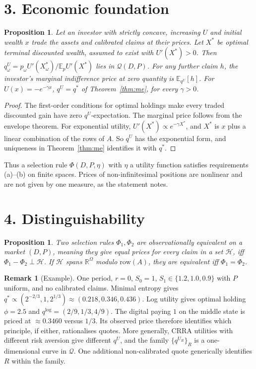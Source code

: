 \documentclass[11pt]{article}
\newtheorem{proposition}[theorem]{Proposition}
\theoremstyle{definition}
\newtheorem{remark}[theorem]{Remark}
\begin{document}
\section*{3. Economic foundation}
\begin{proposition}\label{prop:util}
Let an investor with strictly concave, increasing $U$ and initial wealth $x$ trade the assets and calibrated claims at
their prices. Let $X^*$ be optimal terminal discounted wealth, assumed to exist with $U'(X^*)>0$. Then
$q^U_\omega=p_\omega U'(X^*_\omega)/\mathbb E_pU'(X^*)$ lies in $\mathcal Q(D,P)$. For any further claim $h$, the
investor's marginal indifference price at zero quantity is $\mathbb E_{q^U}[h]$. For $U(x)=-e^{-\gamma x}$, $q^U=q^*$ of
Theorem~\ref{thm:me}, for every $\gamma>0$.
\end{proposition}
\begin{proof}
The first-order conditions for optimal holdings make every traded discounted gain have zero $q^U$-expectation. The
marginal price follows from the envelope theorem. For exponential utility, $U'(X^*)\propto e^{-\gamma X^*}$, and $X^*$ is
$x$ plus a linear combination of the rows of $A$. So $q^U$ has the exponential form, and uniqueness in
Theorem~\ref{thm:me} identifies it with $q^*$.
\end{proof}
Thus a selection rule $\Phi(D,P,\eta)$ with $\eta$ a utility function satisfies requirements (a)--(b) on finite spaces.
Prices of non-infinitesimal positions are nonlinear and are not given by one measure, as the statement notes.

\section*{4. Distinguishability}
\begin{proposition}\label{prop:dist}
Two selection rules $\Phi_1,\Phi_2$ are observationally equivalent on a market $(D,P)$, meaning they give equal prices for
every claim in a set $\mathcal H$, iff $\Phi_1-\Phi_2\perp\mathcal H$. If $\mathcal H$ spans $\mathbb R^\Omega$ modulo
$\mathrm{row}(A)$, they are equivalent iff $\Phi_1=\Phi_2$.
\end{proposition}
\begin{remark}[Example]
One period, $r=0$, $S_0=1$, $S_1\in\{1.2,1.0,0.9\}$ with $P$ uniform, and no calibrated claims. Minimal entropy gives
$q^*\propto(2^{-2/3},1,2^{1/3})\approx(0.218,0.346,0.436)$. Log utility gives optimal holding $\phi=2.5$ and
$q^{\log}=(2/9,1/3,4/9)$. The digital paying $1$ on the middle state is priced at $\approx0.3460$ versus $1/3$. Its observed
price therefore identifies which principle, if either, rationalises quotes. More generally, CRRA utilities with different
risk aversion give different $q^U$, and the family $\{q^{U_R}\}_R$ is a one-dimensional curve in $\mathcal Q$. One additional
non-calibrated quote generically identifies $R$ within the family.
\end{remark}
\end{document}
